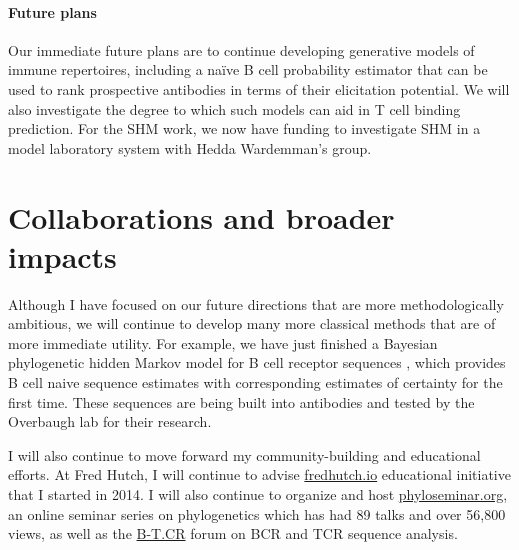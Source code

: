 \documentclass[nobib]{tufte-handout}
\begin{document}
\paragraph{Future plans}
Our immediate future plans are to continue developing generative models of immune repertoires, including a na\"ive B cell probability estimator that can be used to rank prospective antibodies in terms of their elicitation potential.
We will also investigate the degree to which such models can aid in T cell binding prediction.
For the SHM work, we now have funding to investigate SHM in a model laboratory system with Hedda Wardemman's group.


\section{Collaborations and broader impacts}

Although I have focused on our future directions that are more methodologically ambitious, we will continue to develop many more classical methods that are of more immediate utility.
For example, we have just finished a Bayesian phylogenetic hidden Markov model for B cell receptor sequences \cite{Dhar2019-qg}, which provides B cell naive sequence estimates with corresponding estimates of certainty for the first time.
These sequences are being built into antibodies and tested by the Overbaugh lab for their research.

I will also continue to move forward my community-building and educational efforts.
At Fred Hutch, I will continue to advise \href{http://fredhutch.io/}{fredhutch.io} educational initiative that I started in 2014.
I will also continue to organize and host \href{http://phyloseminar.org/}{phyloseminar.org}, an online seminar series on phylogenetics which has had 89 talks and over 56,800 views, as well as the \href{http://b-t.cr/}{B-T.CR} forum on BCR and TCR sequence analysis.


%
\end{document}
